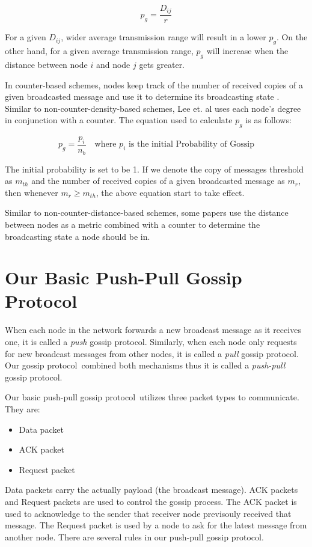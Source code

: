 \documentclass[onehalf,11pt]{beavtex}
\newcommand{\gp}{gossip protocol}
\newcommand{\pog}{Probability of Gossip}
\newcommand{\msg}{message}
\begin{document}
\[ p_g = \frac{D_{ij}}{r}\]

For a given $D_{ij}$, wider average transmission range will result in a lower $p_g$. On the other hand, for a given average transmission range, $p_g$ will increase when the distance between node $i$ and node $j$ gets greater.

In counter-based schemes, nodes keep track of the number of received copies of a given broadcasted message and use it to determine its broadcasting state \cite{2015survey}. Similar to non-counter-density-based schemes, Lee et. al \cite{lee2010adaptive} uses each node's degree in conjunction with a counter. The equation used to calculate $p_g$ is as follows:

\[ p_g = \frac{p_i}{n_b} \quad \mbox{where } p_i \mbox{ is the initial \pog}\]

The initial probability is set to be 1. If we denote the copy of messages threshold as $m_{th}$ and the number of received copies of a given broadcasted message as $m_r$, then whenever $m_r \geq m_{th}$, the above equation start to take effect.

Similar to non-counter-distance-based schemes, some papers \cite{khan2008distance}\cite{ling2005coverage} use the distance between nodes as a metric combined with a counter to determine the broadcasting state a node should be in. 

\section{Our Basic Push-Pull Gossip Protocol} \label{pp}
When each node in the network forwards a new broadcast message as it receives one, it is called a \emph{push} \gp. Similarly, when each node only requests for new broadcast messages from other nodes, it is called  a \emph{pull} \gp. Our \gp ~combined both mechanisms thus it is called a \emph{push-pull} \gp. 

Our basic push-pull \gp ~utilizes three packet types to communicate. They are:
\begin{itemize}
	\item Data packet
	\item ACK packet 
	\item Request packet
\end{itemize}

Data packets carry the actually payload (the broadcast \msg). ACK packets and Request packets are used to control the gossip process. The ACK packet is used to acknowledge to the sender that receiver node previsouly received that \msg. The Request packet is used by a node to ask for the latest message from another node. There are several rules in our push-pull \gp. 
\end{document}
